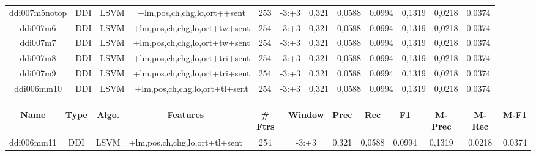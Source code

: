 \documentclass[a4paper]{article}
\begin{document}
\begin{landscape}
\begin{center}
\begin{tabular}{ |c|c|c|c|c|c|c|c|c|c|c|c|}
 	
 
 	
 		
 		\small{ ddi007m5notop } & DDI & LSVM & +lm,pos,ch,chg,lo,ort++sent  &  253 &  -3:+3  &  0,321 & 0,0588 & 0.0994  &  0,1319 & 0,0218 & 0.0374 \\
 		

 	
 
 	
 		
 		\small{ ddi007m6 } & DDI & LSVM & +lm,pos,ch,chg,lo,ort+tw+sent  &  254 &  -3:+3  &  0,321 & 0,0588 & 0.0994  &  0,1319 & 0,0218 & 0.0374 \\
 		

 	
 
 	
 		
 		\small{ ddi007m7 } & DDI & LSVM & +lm,pos,ch,chg,lo,ort+tw+sent  &  254 &  -3:+3  &  0,321 & 0,0588 & 0.0994  &  0,1319 & 0,0218 & 0.0374 \\
 		

 	
 
 	
 		
 		\small{ ddi007m8 } & DDI & LSVM & +lm,pos,ch,chg,lo,ort+tri+sent  &  254 &  -3:+3  &  0,321 & 0,0588 & 0.0994  &  0,1319 & 0,0218 & 0.0374 \\
 		

 	
 
 	
 		
 		\small{ ddi007m9 } & DDI & LSVM & +lm,pos,ch,chg,lo,ort+tri+sent  &  254 &  -3:+3  &  0,321 & 0,0588 & 0.0994  &  0,1319 & 0,0218 & 0.0374 \\
 		

 	
 
 	
 		
 		\small{ ddi006mm10 } & DDI & LSVM & +lm,pos,ch,chg,lo,ort+tl+sent  &  254 &  -3:+3  &  0,321 & 0,0588 & 0.0994  &  0,1319 & 0,0218 & 0.0374 \\
 		
 \hline
\end{tabular}
\end{center}




\begin{center}
\begin{tabular}{ |c|c|c|c|c|c|c|c|c|c|c|c|} 
 \hline
 	Name & Type & Algo. & Features & \# Ftrs & Window & Prec & Rec & F1 & M-Prec & M-Rec & M-F1\\
 \hline

 		

 	
 
 	
 		
 		\small{ ddi006mm11 } & DDI & LSVM & +lm,pos,ch,chg,lo,ort+tl+sent  &  254 &  -3:+3  &  0,321 & 0,0588 & 0.0994  &  0,1319 & 0,0218 & 0.0374 \\
 		


\end{tabular}
\end{center}
\end{landscape}
\end{document}
